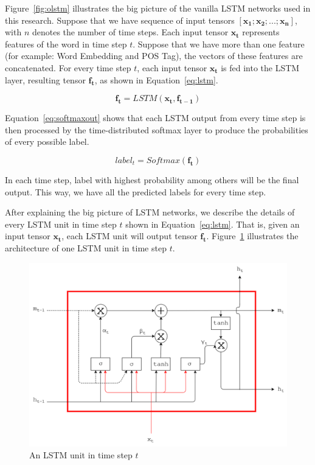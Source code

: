 Figure~\ref{fig:olstm} illustrates the big picture of the vanilla LSTM networks used in this research. Suppose that we have sequence of input tensors $[\mathbf{x_{1}}; \mathbf{x_{2}}; ...; \mathbf{x_{n}}]$, with $n$ denotes the number of time steps. Each input tensor $\mathbf{x_{t}}$ represents features of the word in time step $t$. Suppose that we have more than one feature (for example: Word Embedding and POS Tag), the vectors of these features are concatenated. For every time step $t$, each input tensor $\mathbf{x_{t}}$ is fed into the LSTM layer, resulting tensor $\mathbf{f_{t}}$, as shown in Equation~\ref{eq:lstm}. 

\begin{equation}
\label{eq:lstm}
\mathbf{f_{t}} = LSTM(\mathbf{x_{t}}, \mathbf{f_{t-1}})
\end{equation}

Equation~\ref{eq:softmaxout} shows that each LSTM output from every time step is then processed by the time-distributed softmax layer to produce the probabilities of every possible label.

\begin{equation}
\label{eq:softmaxout}
label_{t} = Softmax(\mathbf{f_{t}})
\end{equation}

In each time step, label with highest probability among others will be the final output. This way, we have all the predicted labels for every time step.

After explaining the big picture of LSTM networks, we describe the details of every LSTM unit in time step $t$ shown in Equation~\ref{eq:lstm}. That is, given an input tensor $\mathbf{x_{t}}$, each LSTM unit will output tensor $\mathbf{f_{t}}$. Figure~\ref{fig:lstmunit} illustrates the architecture of one LSTM unit in time step $t$.

\begin{figure}
	\centering
	\includegraphics[width=0.85\linewidth]{images/lstm}
	\caption{An LSTM unit in time step $t$}
	\label{fig:lstmunit}
\end{figure}

